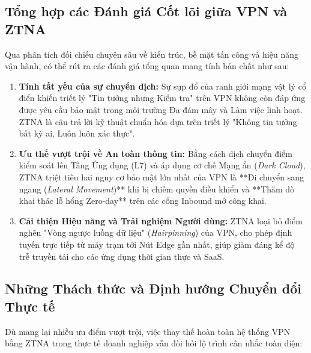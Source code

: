 \subsection{Tổng hợp các Đánh giá Cốt lõi giữa VPN và ZTNA}
\label{subsec:4_4_1}

Qua phân tích đối chiếu chuyên sâu về kiến trúc, bề mặt tấn công và hiệu năng vận hành, có thể rút ra các đánh giá tổng quan mang tính bản chất như sau:

\begin{enumerate}
    \item \textbf{Tính tất yếu của sự chuyển dịch:} Sự sụp đổ của ranh giới mạng vật lý cổ điển khiến triết lý "Tin tưởng nhưng Kiểm tra" trên VPN không còn đáp ứng được yêu cầu bảo mật trong môi trường Đa đám mây và Làm việc linh hoạt. ZTNA là câu trả lời kỹ thuật chuẩn hóa dựa trên triết lý "Không tin tưởng bất kỳ ai, Luôn luôn xác thực".
    \item \textbf{Ưu thế vượt trội về An toàn thông tin:} Bằng cách dịch chuyển điểm kiểm soát lên Tầng Ứng dụng (L7) và áp dụng cơ chế Mạng ẩn (\textit{Dark Cloud}), ZTNA triệt tiêu hai nguy cơ bảo mật lớn nhất của VPN là **Di chuyển sang ngang (\textit{Lateral Movement})** khi bị chiếm quyền điều khiển và **Thăm dò khai thác lỗ hổng Zero-day** trên các cổng Inbound mở công khai.
    \item \textbf{Cải thiện Hiệu năng và Trải nghiệm Người dùng:} ZTNA loại bỏ điểm nghẽn "Vòng ngược luồng dữ liệu" (\textit{Hairpinning}) của VPN, cho phép định tuyến trực tiếp từ máy trạm tới Nút Edge gần nhất, giúp giảm đáng kể độ trễ truyền tải cho các ứng dụng thời gian thực và SaaS.
\end{enumerate}

\subsection{Những Thách thức và Định hướng Chuyển đổi Thực tế}
\label{subsec:4_4_2}

Dù mang lại nhiều ưu điểm vượt trội, việc thay thế hoàn toàn hệ thống VPN bằng ZTNA trong thực tế doanh nghiệp vẫn đòi hỏi lộ trình cân nhắc toàn diện:

